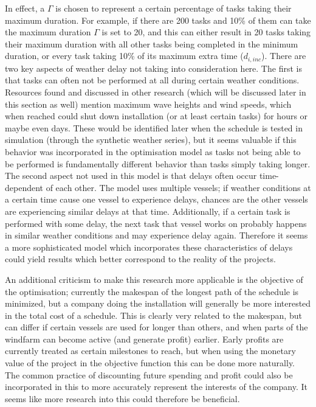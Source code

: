 \documentclass[a4paper,12pt]{article}
\begin{document}
In effect, a $\Gamma$ is chosen to represent a certain percentage of tasks taking their maximum duration. For example, if there are 200 tasks and 10\% of them can take the maximum duration $\Gamma$ is set to 20, and this can either result in 20 tasks taking their maximum duration with all other tasks being completed in the minimum duration, or every task taking 10\% of its maximum extra time ($d_{i, inc}$). There are two key aspects of weather delay not taking into consideration here. The first is that tasks can often not be performed at all during certain weather conditions. Resources found and discussed in other research (which will be discussed later in this section as well) mention maximum wave heights and wind speeds, which when reached could shut down installation (or at least certain tasks) for hours or maybe even days. These would be identified later when the schedule is tested in simulation (through the synthetic weather series), but it seems valuable if this behavior was incorporated in the optimisation model as tasks not being able to be performed is fundamentally different behavior than tasks simply taking longer. The second aspect not used in this model is that delays often occur time-dependent of each other. The model uses multiple vessels; if weather conditions at a certain time cause one vessel to experience delays, chances are the other vessels are experiencing similar delays at that time. Additionally, if a certain task is performed with some delay, the next task that vessel works on probably happens in similar weather conditions and may experience delay again. Therefore it seems a more sophisticated model which incorporates these characteristics of delays could yield results which better correspond to the reality of the projects. 

An additional criticism to make this research more applicable is the objective of the optimisation; currently the makespan of the longest path of the schedule is minimized, but a company doing the installation will generally be more interested in the total cost of a schedule. This is clearly very related to the makespan, but can differ if certain vessels are used for longer than others, and when parts of the windfarm can become active (and generate profit) earlier. Early profits are currently treated as certain milestones to reach, but when using the monetary value of the project in the objective function this can be done more naturally. The common practice of discounting future spending and profit could also be incorporated in this to more accurately represent the interests of the company. It seems like more research into this could therefore be beneficial. 
\end{document}
